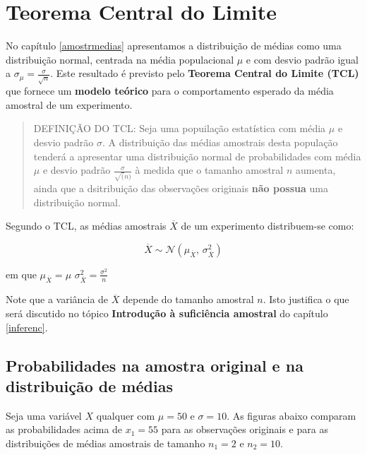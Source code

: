 \documentclass[
]{book}
\begin{document}
\hypertarget{teorema-central-do-limite}{%
\section{Teorema Central do Limite}\label{teorema-central-do-limite}}

No capítulo \ref{amostrmedias} apresentamos a distribuição de médias como uma distribuição normal, centrada na média populacional \(\mu\) e com desvio padrão igual a \(\sigma_{\mu} = \frac{\sigma}{\sqrt{n}}\). Este resultado é previsto pelo \textbf{Teorema Central do Limite (TCL)} que fornece um \textbf{modelo teórico} para o comportamento esperado da média amostral de um experimento.

\begin{quote}
DEFINIÇÃO DO TCL: Seja uma popuilação estatística com média \(\mu\) e desvio padrão \(\sigma\). A distribuição das médias amostrais desta população tenderá a apresentar uma distribuição normal de probabilidades com média \(\mu\) e desvio padrão \(\frac{\sigma}{\sqrt(n)}\) à medida que o tamanho amostral \(n\) aumenta, ainda que a dsitribuição das observações originais \textbf{não possua} uma distribuição normal.
\end{quote}

Segundo o TCL, as médias amostrais \(\overline{X}\) de um experimento distribuem-se como:

\[\overline{X} \sim \mathcal{N}(\mu_{\overline{X}},\,\sigma^{2}_{\overline{X}})\]

em que \(\mu_{\overline{X}} = \mu\) \(\sigma^{2}_{\overline{X}} = \frac{\sigma^2}{n}\)

Note que a variância de \(\overline{X}\) depende do tamanho amostral \(n\). Isto justifica o que será discutido no tópico \textbf{Introdução à suficiência amostral} do capítulo \ref{inferenc}.

\hypertarget{probabilidades-na-amostra-original-e-na-distribuiuxe7uxe3o-de-muxe9dias}{%
\subsection{Probabilidades na amostra original e na distribuição de médias}\label{probabilidades-na-amostra-original-e-na-distribuiuxe7uxe3o-de-muxe9dias}}

Seja uma variável \(X\) qualquer com \(\mu = 50\) e \(\sigma = 10\). As figuras abaixo comparam as probabilidades acima de \(x_1 = 55\) para as observações originais e para as distribuições de médias amostrais de tamanho \(n_1 = 2\) e \(n_2 = 10\).
\end{document}

